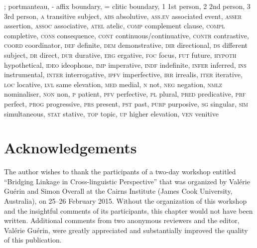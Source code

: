 \documentclass[output=paper]{LSP/langsci}
\begin{document}
\textsc{;} portmanteau,
\textsc{-} affix boundary,
\textsc{=} clitic boundary,
\textsc{1} 1st person,
\textsc{2} 2nd person,
\textsc{3} 3rd person,
\textsc{a} transitive subject,
\textsc{abs} absolutive,
\textsc{ass.ev} associated event,
\textsc{asser} assertion,
\textsc{assoc} associative,
\textsc{atel} atelic,
\textsc{comp} complement clause,
\textsc{compl} completive,
\textsc{cons} consequence,
\textsc{cont} continuous/continuative,
\textsc{contr} contrastive,
\textsc{coord} coordinator,
\textsc{def} definite,
\textsc{dem} demonstrative,
\textsc{dir} directional,
\textsc{ds} different subject,
\textsc{dr} direct,
\textsc{dur} durative,
\textsc{erg} ergative,
\textsc{foc} focus,
\textsc{fut} future,
\textsc{hypoth} hypothetical,
\textsc{ideo} ideophone,
\textsc{imp} imperative,
\textsc{indf} indefinite,
\textsc{infer} inferred,
\textsc{ins} instrumental,
\textsc{inter} interrogative,
\textsc{ipfv} imperfective,
\textsc{irr} irrealis,
\textsc{iter} iterative,
\textsc{loc} locative,
\textsc{lvl} same elevation,
\textsc{med} medial,
\textsc{n} not,
\textsc{neg} negation,
\textsc{nmlz} nominaliser,
\textsc{non} non,
\textsc{p} patient,
\textsc{pfv} perfective,
\textsc{pl} plural,
\textsc{pred} predicative,
\textsc{prf} perfect,
\textsc{prog} progressive,
\textsc{prs} present,
\textsc{pst} past,
\textsc{purp} purposive,
\textsc{sg} singular,
\textsc{sim} simultaneous,
\textsc{stat} stative,
\textsc{top} topic,
\textsc{up} higher elevation,
\textsc{ven} venitive

\section*{Acknowledgements}
The author wishes to thank the participants of a two-day workshop entitled ``Bridging Linkage in Cross-linguistic Perspective'' that was organized by Valérie Guérin and Simon Overall at the Cairns Institute (James Cook University, Australia), on 25--26 February 2015. Without the organization of this workshop and the insightful comments of its participants, this chapter would not have been written. Additional comments from two anonymous reviewers and the editor, Valérie Guérin, were greatly appreciated and substantially improved the quality of this publication.




\sloppy

\printbibliography[heading=subbibliography,notkeyword=this] 
\end{document}
